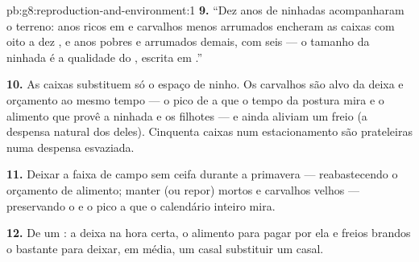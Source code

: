 \begin{solution}{pb:g8:reproduction-and-environment:1}
\textbf{9.} ``Dez anos de ninhadas acompanharam o terreno: anos ricos
em  e carvalhos menos arrumados encheram as caixas com oito a
dez , e anos pobres e arrumados demais, com seis --- o tamanho da
ninhada é a qualidade do , escrita em .''

\textbf{10.} As caixas substituem só o espaço de ninho. Os carvalhos
são alvo da deixa e orçamento ao mesmo tempo --- o pico de  a
que o tempo da postura mira e o alimento que provê a ninhada e os
filhotes --- e ainda aliviam um freio (a despensa natural dos 
deles). Cinquenta caixas num estacionamento são prateleiras numa
despensa esvaziada.

\textbf{11.} Deixar a faixa de campo sem ceifa durante a primavera ---
reabastecendo o orçamento de alimento; manter (ou repor)  mortos
e carvalhos velhos --- preservando o  e o pico a que o
calendário inteiro mira.

\textbf{12.} De um : a deixa na hora certa, o alimento para
pagar por ela e freios brandos o bastante para deixar, em média, um
casal substituir um casal.
\end{solution}
